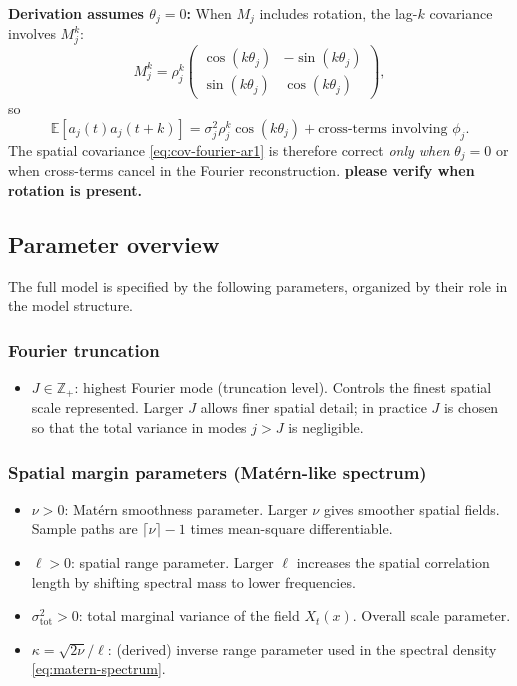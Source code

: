 \documentclass[answers,12pt,addpoints]{exam}
\begin{document}
{\color{blue}
\textbf{Derivation assumes $\theta_j = 0$:} When $M_j$ includes rotation, the lag-$k$ covariance involves $M_j^k$:
\[
  M_j^k = \rho_j^k \begin{pmatrix} \cos(k\theta_j) & -\sin(k\theta_j) \\ \sin(k\theta_j) & \cos(k\theta_j) \end{pmatrix},
\]
so
\[
  \mathbb{E}[a_j(t) a_j(t+k)] = \sigma_j^2 \rho_j^k \cos(k\theta_j) + \text{cross-terms involving } \phi_j.
\]
The spatial covariance \eqref{eq:cov-fourier-ar1} is therefore correct \emph{only when} $\theta_j = 0$ or when cross-terms cancel in the Fourier reconstruction. \textbf{please verify when rotation is present.}
}

\subsection{Parameter overview}

The full model is specified by the following parameters, organized by their role in the model structure.

\subsubsection*{Fourier truncation}

\begin{itemize}
  \item $J \in \mathbb{Z}_+$: highest Fourier mode (truncation level). Controls the finest spatial scale represented. Larger $J$ allows finer spatial detail; in practice $J$ is chosen so that the total variance in modes $j > J$ is negligible.
\end{itemize}

\subsubsection*{Spatial margin parameters (Matérn-like spectrum)}

\begin{itemize}
  \item $\nu > 0$: Matérn smoothness parameter. Larger $\nu$ gives smoother spatial fields. Sample paths are $\lceil \nu \rceil - 1$ times mean-square differentiable.
  \item $\ell > 0$: spatial range parameter. Larger $\ell$ increases the spatial correlation length by shifting spectral mass to lower frequencies.
  \item $\sigma^2_{\text{tot}} > 0$: total marginal variance of the field $X_t(x)$. Overall scale parameter.
  \item $\kappa = \sqrt{2\nu}/\ell$: (derived) inverse range parameter used in the spectral density \eqref{eq:matern-spectrum}.
\end{itemize}
\end{document}
